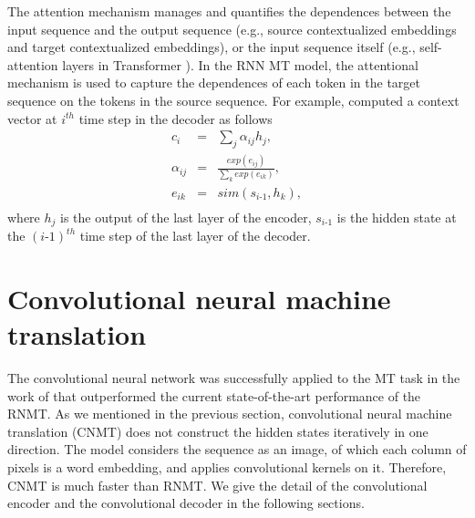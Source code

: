 The attention mechanism manages and quantifies the dependences between the input sequence and the output sequence (e.g., source contextualized embeddings and target contextualized embeddings), or the input sequence itself (e.g., self-attention layers in Transformer \citep{Vaswani17attention}). In the RNN MT model, the attentional mechanism is used to capture the dependences of each token in the target sequence on the tokens in the source sequence. For example, \citet{Bahdanau15learning} computed a context vector at $i^{th}$ time step in the decoder as follows
\begin{equation}
\begin{array}{rcl}
c_i &=& \sum_{j} \alpha_{ij} h_j, \\
\alpha_{ij} &=& \frac{exp(e_{ij})}{\sum_{k}exp(e_{ik})}, \\
e_{ik} &=& sim(s_{i\text{-}1},h_k),\\
\end{array}
\end{equation}
where $h_j$ is the output of the last layer of the encoder, $s_{i\text{-}1}$ is the hidden state at the $(i\text{-}1)^{th}$ time step of the last layer of the decoder. 

\section{Convolutional neural machine translation} \label{sec:cnn}
The convolutional neural network was successfully applied to the MT task in the work of \citet{Ghering17convolutional} that outperformed the current state-of-the-art performance of the RNMT. As we mentioned in the previous section, convolutional neural machine translation (CNMT) does not construct the hidden states iteratively in one direction. The model considers the sequence as an image, of which each column of pixels is a word embedding, and applies convolutional kernels on it. Therefore, CNMT is much faster than RNMT. We give the detail of the convolutional encoder and the convolutional decoder in the following sections.
